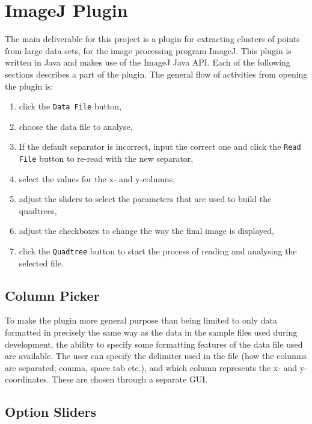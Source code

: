 
\section{ImageJ Plugin}
\label{sec:imagej_plugin}

The main deliverable for this project is a plugin for extracting clusters of
points from large data sets, for the image processing program ImageJ. This
plugin is written in Java and makes use of the ImageJ Java API\cite{imagejapi}.
Each of the following sections describes a part of the plugin. The general flow
of activities from opening the plugin is:

\begin{enumerate}
	\item click the \texttt{Data File} button,
	\item choose the data file to analyse,
	\item If the default separator is incorrect, input the correct one and
		click the \texttt{Read File} button to re-read with the new separator,
	\item select the values for the x- and y-columns,
	\item adjust the sliders to select the parameters that are used to build
		the quadtrees,
	\item adjust the checkboxes to change the way the final image is displayed,
	\item click the \texttt{Quadtree} button to start the process of reading
		and analysing the selected file.
\end{enumerate}

\subsection{Column Picker}
\label{sub:column_picker}

To make the plugin more general purpose than being limited to only data
formatted in precisely the same way as the data in the sample files used during
development, the ability to specify some formatting features of the data file
used are available. The user can specify the delimiter used in the file (how
the columns are separated; comma, space tab etc.), and which column represents
the x- and y-coordinates. These are chosen through a separate GUI.

\subsection{Option Sliders}
\label{sub:option_sliders}

